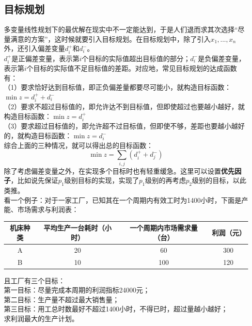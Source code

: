 \documentclass[11pt,a4paper]{article}
\begin{document}
\subsection{目标规划}
\indent\setlength{\parindent}{2em}多变量线性规划下的最优解在现实中不一定能达到，于是人们退而求其次选择“尽量满意的方案”，这时候就要引入目标规划。在目标规划中，除了引入$x_1,...,x_n$外，还引入偏差变量$d_i^+$和$d_i^-$。\\
\indent\setlength{\parindent}{2em}$d_i^+$是正偏差变量，表示第$i$个目标的实际值超出目标值的部分；$d_i^-$是负偏差变量，表示第$i$个目标的实际值不足目标值的差距。对应地，常见目标规划的达成函数有：\\
（1）要求恰好达到目标值，即正负偏差量都要尽可能小，就构造目标函数：$\min z=d_i^+ + d_i^-$\\
（2）要求不超过目标值的，即允许达不到目标值，但即使超过也要越小越好，就构造目标函数：$\min z=d_i^+$\\
（3）要求超过目标值的，即允许超不过目标值，但即使不够，差距也要越小越好的，就构造目标函数：$\min z= d_i^-$\\
综合上面的三种情况，就可以得出总的目标函数：
\begin{equation*}
\min z= \sum_{i,j} (d_i^+ + d_j^-)
\end{equation*}
除了考虑偏差变量之外，在实现多个目标时也有轻重缓急。这里可以设置\textbf{优先因子}，比如说先保证$p_1$级别目标的实现，实现了$p_1$级别的再考虑$p_2$级别的目标，以此类推。\\
\newpage
看一个例子：对于一家工厂，已知其在一个周期内有效工时为1400小时，下面是产能、市场需求与利润表：
\begin{table}[h]
	\centering
	\begin{tabular}{cccc}
		\hline
		机床种类& 平均生产一台耗时（小时）  & 一个周期内市场需求量（台） & 利润（元） \\
		\hline
		A & 20 &60 &300\\
		B & 10 &100 &120  \\
		\hline
	\end{tabular}
\end{table}

\noindent 且工厂有三个目标：\\
第一目标：尽量完成本周期的利润指标24000元；\\
第二目标：生产量不超过最大销售量；\\
第三目标：用工总时数最好不超过1400小时，不得已时，超过量越小越好；\\
求利润最大的生产计划。\\
\end{document}
